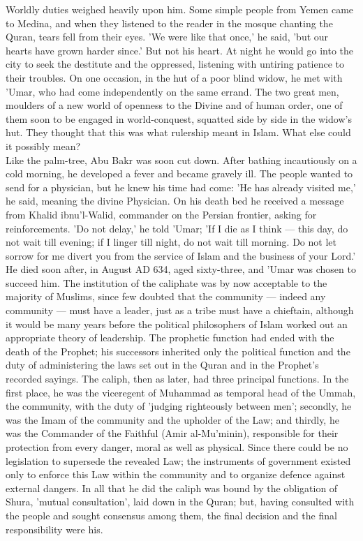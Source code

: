 \documentclass[10pt, twoside,openright]{book}
\begin{document}
Worldly duties weighed heavily upon him. Some simple people from Yemen came to Medina, and when they listened to the reader in the mosque chanting the Quran, tears fell from their eyes. 'We were like that once,' he said, 'but our hearts have grown harder since.' But not his heart. At night he would go into the city to seek the destitute and the oppressed, listening with untiring patience to their troubles. On one occasion, in the hut of a poor blind widow, he met with 'Umar, who had come independently on the same errand. The two great men, moulders of a new world of openness to the Divine and of human order, one of them soon to be engaged in world\hyp{}conquest, squatted side by side in the widow's hut. They thought that this was what rulership meant in Islam. What else could it possibly mean? \\

Like the palm\hyp{}tree, Abu Bakr was soon cut down. After bathing incautiously on a cold morning, he developed a fever and became gravely ill. The people wanted to send for a physician, but he knew his time had come: 'He has already visited me,' he said, meaning the divine Physician. On his death bed he received a message from Khalid ibnu'l\hyp{}Walid, commander on the Persian frontier, asking for reinforcements. 'Do not delay,' he told 'Umar; 'If I die as I think --- this day, do not wait till evening; if I linger till night, do not wait till morning. Do not let sorrow for me divert you from the service of Islam and the business of your Lord.' \\

He died soon after, in August AD 634, aged sixty\hyp{}three, and 'Umar was chosen to succeed him. The institution of the caliphate was by now acceptable to the majority of Muslims, since few doubted that the community --- indeed any community --- must have a leader, just as a tribe must have a chieftain, although it would be many years before the political philosophers of Islam worked out an appropriate theory of leadership. The prophetic function had ended with the death of the Prophet; his successors inherited only the political function and the duty of administering the laws set out in the Quran and in the Prophet's recorded sayings. The caliph, then as later, had three principal functions. In the first place, he was the viceregent of Muhammad as temporal head of the Ummah, the community, with the duty of 'judging righteously between men'; secondly, he was the Imam of the community and the upholder of the Law; and thirdly, he was the Commander of the Faithful (Amir al\hyp{}Mu'minin), responsible for their protection from every danger, moral as well as physical. Since there could be no legislation to supersede the revealed Law; the instruments of government existed only to enforce this Law within the community and to organize defence against external dangers. In all that he did the caliph was bound by the obligation of Shura, 'mutual consultation', laid down in the Quran; but, having consulted with the people and sought consensus among them, the final decision and the final responsibility were his. \\
\end{document}
